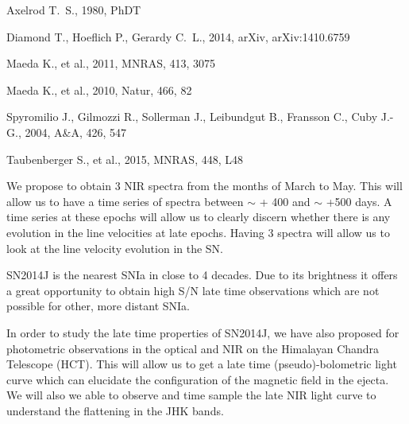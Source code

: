 \documentclass[11pt]{article}
\begin{document}
\begin{thebibliography}{99}
Axelrod T.~S., 1980, PhDT 

 Diamond T., Hoeflich P., Gerardy C.~L., 2014, arXiv, arXiv:1410.6759 


Maeda K., et al., 2011, MNRAS, 413, 3075 

Maeda K., et al., 2010, Natur, 466, 82 

 Spyromilio J., Gilmozzi R., Sollerman J., Leibundgut B., Fransson C., Cuby J.-G., 2004, A\&A, 426, 547 


 Taubenberger S., et al., 2015, MNRAS, 448, 
L48 


\end{thebibliography}


%

\expdesign    %

We propose to obtain 3 NIR spectra from the months of March to May. This will allow us to have  a time series of spectra between $\sim$ + 400 and $\sim$ +500 days. A time series at these epochs will allow us to clearly discern whether there is any evolution in the line velocities at late epochs. 
Having 3 spectra will allow us to look at the line velocity evolution in the SN. 

SN2014J is the nearest SNIa in close to 4 decades. Due to its brightness it offers a great opportunity to obtain high S/N late time observations which are not possible for other, more distant SNIa.

In order to study the late time properties of SN2014J, we have also proposed for photometric observations in the optical and NIR on the Himalayan Chandra Telescope (HCT). This will allow us to get a late time (pseudo)-bolometric light curve which can elucidate the configuration of the magnetic field in the ejecta. We will also we able to observe and time sample the late NIR light curve to understand the flattening in the JHK bands. 
\end{document}
